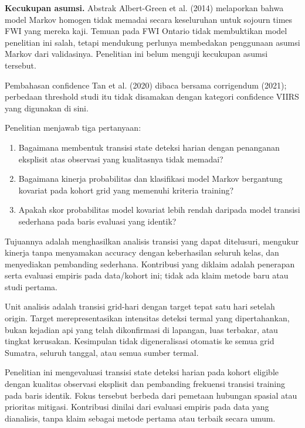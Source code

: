 \documentclass[12pt,a4paper]{article}
\begin{document}
\textbf{Kecukupan asumsi.} Abstrak Albert-Green et al. (2014) melaporkan bahwa model Markov homogen tidak memadai secara keseluruhan untuk sojourn times FWI yang mereka kaji. Temuan pada FWI Ontario tidak membuktikan model penelitian ini salah, tetapi mendukung perlunya membedakan penggunaan asumsi Markov dari validasinya. Penelitian ini belum menguji kecukupan asumsi tersebut.


Pembahasan confidence Tan et al. (2020) dibaca bersama corrigendum (2021); perbedaan threshold studi itu tidak disamakan dengan kategori confidence VIIRS yang digunakan di sini.


Penelitian menjawab tiga pertanyaan:


\begin{enumerate}\setlength{\itemsep}{2pt}\setlength{\parskip}{0pt}

\item Bagaimana membentuk transisi state deteksi harian dengan penanganan eksplisit atas observasi yang kualitasnya tidak memadai?

\item Bagaimana kinerja probabilitas dan klasifikasi model Markov bergantung kovariat pada kohort grid yang memenuhi kriteria training?

\item Apakah skor probabilitas model kovariat lebih rendah daripada model transisi sederhana pada baris evaluasi yang identik?

\end{enumerate}

Tujuannya adalah menghasilkan analisis transisi yang dapat ditelusuri, mengukur kinerja tanpa menyamakan accuracy dengan keberhasilan seluruh kelas, dan menyediakan pembanding sederhana. Kontribusi yang diklaim adalah penerapan serta evaluasi empiris pada data/kohort ini; tidak ada klaim metode baru atau studi pertama.


Unit analisis adalah transisi grid-hari dengan target tepat satu hari setelah origin. Target merepresentasikan intensitas deteksi termal yang dipertahankan, bukan kejadian api yang telah dikonfirmasi di lapangan, luas terbakar, atau tingkat kerusakan. Kesimpulan tidak digeneralisasi otomatis ke semua grid Sumatra, seluruh tanggal, atau semua sumber termal.


Penelitian ini mengevaluasi transisi state deteksi harian pada kohort eligible dengan kualitas observasi eksplisit dan pembanding frekuensi transisi training pada baris identik. Fokus tersebut berbeda dari pemetaan hubungan spasial atau prioritas mitigasi. Kontribusi dinilai dari evaluasi empiris pada data yang dianalisis, tanpa klaim sebagai metode pertama atau terbaik secara umum.
\end{document}
